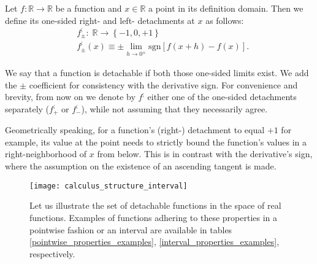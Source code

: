 \documentclass[11pt]{book}
\begin{document}
\begin{definition}
Let $f:\mathbb{R}\rightarrow\mathbb{R}$ be a function and $x\in\mathbb{R}$ a point in its definition domain. Then we define its one-sided right- and left- detachments at $x$ as follows:
 $$\begin{array}{ccc}& f_{\pm}^{;}:\;\mathbb{R}\rightarrow\left\{ -1,0,+1\right\} \\
& f_{\pm}^{;}\left(x\right)\equiv \pm \underset{{\scriptscriptstyle h\rightarrow0^{\pm}}}{\lim}\text{sgn}\left[f\left(x+h\right)-f\left(x\right)\right].
\end{array}$$
\end{definition}

We say that a function is detachable if both those one-sided limits exist. We add the $\pm$ coefficient for consistency with the derivative sign. For convenience and brevity, from now on we denote by $f^;$ either one of the one-sided detachments separately ($f^;_+$ or $f^;_-$), while not assuming that they necessarily agree.

Geometrically speaking, for a function's (right-) detachment to equal $+1$ for example, its value at the point needs to strictly bound the function's values in a right-neighborhood of $x$ from below. This is in contrast with the derivative's sign, where the assumption on the existence of an ascending tangent is made.

\begin{figure}[h!]
\texttt{[image: calculus\_structure\_interval]}
\caption{Let us illustrate the set of detachable functions in the space of real functions. Examples of functions adhering to these properties in a pointwise fashion or an interval are available in tables \ref{pointwise_properties_examples}, \ref{interval_properties_examples}, respectively.}
\label{calculus_structure_interval}
\end{figure}
\end{document}
